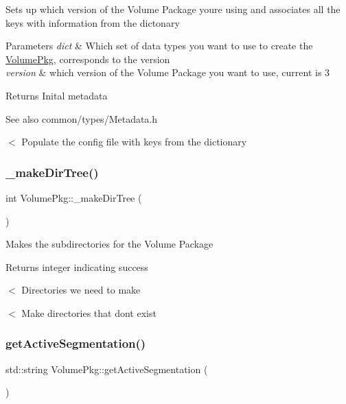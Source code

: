 Sets up which version of the Volume Package you\textquotesingle{}re using and associates all the keys with information from the dictonary 
\begin{DoxyParams}{Parameters}
{\em dict} & Which set of data types you want to use to create the \hyperlink{classVolumePkg}{Volume\+Pkg}, corresponds to the version \\
\hline
{\em version} & which version of the Volume Package you want to use, current is 3 \\
\hline
\end{DoxyParams}
\begin{DoxyReturn}{Returns}
Inital metadata 
\end{DoxyReturn}
\begin{DoxySeeAlso}{See also}
common/types/\+Metadata.\+h 
\end{DoxySeeAlso}
$<$ Populate the config file with keys from the dictionary \hypertarget{classVolumePkg_ac141a45c12eb8e53def13282b2594ebe}{}\label{classVolumePkg_ac141a45c12eb8e53def13282b2594ebe} 
\subsubsection{\texorpdfstring{\+\_\+make\+Dir\+Tree()}{\_makeDirTree()}}
{\footnotesize\ttfamily int Volume\+Pkg\+::\+\_\+make\+Dir\+Tree (\begin{DoxyParamCaption}{ }\end{DoxyParamCaption})\hspace{0.3cm}{\ttfamily [private]}}

Makes the subdirectories for the Volume Package \begin{DoxyReturn}{Returns}
integer indicating success 
\end{DoxyReturn}
$<$ Directories we need to make

$<$ Make directories that don\textquotesingle{}t exist \hypertarget{classVolumePkg_ab603499204250e15b5532acb51e750d6}{}\label{classVolumePkg_ab603499204250e15b5532acb51e750d6} 
\subsubsection{\texorpdfstring{get\+Active\+Segmentation()}{getActiveSegmentation()}}
{\footnotesize\ttfamily std\+::string Volume\+Pkg\+::get\+Active\+Segmentation (\begin{DoxyParamCaption}{ }\end{DoxyParamCaption})}

